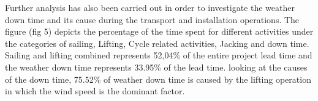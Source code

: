 Further analysis has also been carried out in order to investigate the weather down time and its cause during the transport and installation operations. The figure (fig 5) depicts the percentage of the time spent for different activities under the categories  of  sailing, Lifting, Cycle related activities, Jacking and down time. Sailing and lifting combined represents 52,04\% of the entire project lead time and the weather down time represents 33.95\% of the lead time. looking at the causes of the down time, 75.52\% of weather down time is caused by the lifting operation in which the wind speed is the dominant factor.